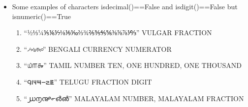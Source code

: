 \documentclass[a4paper,12pt]{article}
\begin{document}
\begin{enumerate}
\begin{itemize}
\begin{enumerate}
\item ``⁰¹²³⁴⁵⁶⁷⁸⁹''  SUPERSCRIPT ZERO\textasciitilde{}NINE\\
\item ``₀₁₂₃₄₅₆₇₈₉''  SUBSCRIPT ZERO\textasciitilde{}NINE\\
\item ``🄀⒈⒉⒊⒋⒌⒍⒎⒏⒐''  DIGIT ZERO\textasciitilde{}NINE FULL STOP\\
\item ``🄁🄂🄃🄄🄅🄆🄇🄈🄉🄊''  DIGIT ZERO\textasciitilde{}NINE COMMA\\
\item ``⓪①②③④⑤⑥⑦⑧⑨''  CIRCLED DIGIT ZERO\textasciitilde{}NINE\\
\item ``⓿❶❷❸❹❺❻❼❽❾''  NEGATIVE CIRCLED DIGIT ZERO\textasciitilde{}NINE\\
\item ``⑴⑵⑶⑷⑸⑹⑺⑻⑼''  PARENTHESIZED DIGIT ONE\textasciitilde{}NINE\\
\item ``➀➁➂➃➄➅➆➇➈''  DINGBAT CIRCLED SANS-SERIF DIGIT ONE\textasciitilde{}NINE\\
\item ``⓵⓶⓷⓸⓹⓺⓻⓼⓽''  DOUBLE CIRCLED DIGIT ONE\textasciitilde{}NINE\\
\item ``➊➋➌➍➎➏➐➑➒''  DINGBAT NEGATIVE CIRCLED SANS-SERIF DIGIT ONE\textasciitilde{}NINE\\
\item ``፩፪፫፬፭፮፯፰፱''  ETHIOPIC DIGIT ONE\textasciitilde{}NINE\\
\end{enumerate}
\item Some examples of characters isdecimal()==False and isdigit()==False but isnumeric()==True\\
\begin{enumerate}
\item ``½⅓¼⅕⅙⅐⅛⅑⅒⅔¾⅖⅗⅘⅚⅜⅝⅞⅟↉''  VULGAR FRACTION\\
\item ``৴৵৶৷৸৹''  BENGALI CURRENCY NUMERATOR\\
\item ``௰௱௲''  TAMIL NUMBER TEN, ONE HUNDRED, ONE THOUSAND\\
\item ``౸౹౺౻౼౽౾''  TELUGU FRACTION DIGIT\\
\item ``൰൱൲൳൴൵''  MALAYALAM NUMBER, MALAYALAM FRACTION\\

\end{enumerate}
\end{itemize}
\end{enumerate}
\end{document}
